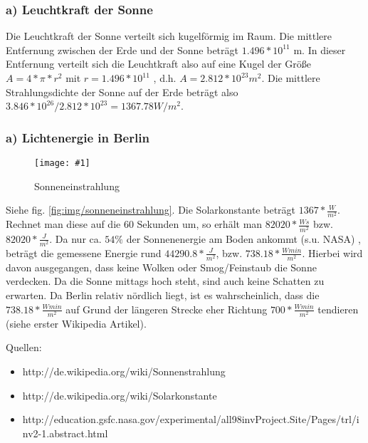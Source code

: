 \documentclass[a4paper,headings=small]{scrartcl}
\numberwithin{equation}{section} %
\numberwithin{figure}{section}   %
\newcommand{\image}[3]{
	\begin{figure}[htbp]
		\centering
		\texttt{[image: \#1]}
		\caption{#3}
		\label{fig:#1}
	\end{figure}
}
\begin{document}
\subsubsection*{a) Leuchtkraft der Sonne}

Die Leuchtkraft der Sonne verteilt sich kugelförmig im Raum.
Die mittlere Entfernung zwischen der Erde und der Sonne beträgt $1.496 * 10^{11}$ m.
In dieser Entfernung verteilt sich die Leuchtkraft also auf eine Kugel der Größe $A = 4 * \pi * r^{2}$ mit $r = 1.496 * 10^{11}$ , d.h. $A = 2.812 * 10^{23} m^{2}$.
Die mittlere Strahlungsdichte der Sonne auf der Erde beträgt also $3.846 * 10^{26} / 2.812 * 10^{23} = 1367.78 W / m^{2}$.

\subsubsection*{a) Lichtenergie in Berlin}

\image{img/sonneneinstrahlung2}{0.8}{Sonneneinstrahlung}

Siehe fig. \ref{fig:img/sonneneinstrahlung}.
Die Solarkonstante beträgt $1367 * \frac{W}{m^2}$. Rechnet man diese auf die 60 Sekunden um, so erhält man $82020 * \frac{W s}{m^2}$ bzw. $82020 * \frac{J}{m^2}$.
Da nur ca. $54\%$ der Sonnenenergie am Boden ankommt (s.u. NASA) , beträgt die gemessene Energie rund $44290.8 * \frac{J}{m^2}$, bzw. $738.18 * \frac{W min}{m^2}$.
Hierbei wird davon ausgegangen, dass keine Wolken oder Smog/Feinstaub die Sonne verdecken. Da die Sonne mittags hoch steht, sind auch keine Schatten zu erwarten.
Da Berlin relativ nördlich liegt, ist es wahrscheinlich, dass die $738.18 * \frac{W min}{m^2}$ auf Grund der längeren Strecke eher Richtung $700 * \frac{W min}{m^2}$ tendieren (siehe erster Wikipedia Artikel).

Quellen:
\begin{itemize}
\item http://de.wikipedia.org/wiki/Sonnenstrahlung
\item http://de.wikipedia.org/wiki/Solarkonstante
\item http://education.gsfc.nasa.gov/experimental/all98invProject.Site/Pages/trl/inv2-1.abstract.html
\end{itemize}
\end{document}
